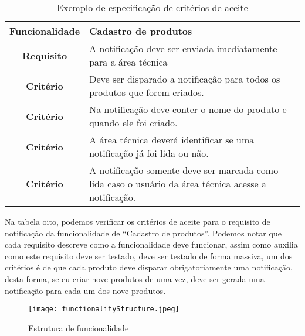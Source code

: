       \begin{table}[h!]
        \centering
        \begin{tabular}{|c|p{10cm}|}
          \hline
          \textbf{Funcionalidade} &
          Cadastro de produtos \\ \hline
          \textbf{Requisito} &
          A notificação deve ser enviada imediatamente para a área técnica \\ \hline
          \textbf{Critério} &
          Deve ser disparado a notificação para todos os produtos que forem criados. \\ \hline
          \textbf{Critério} &
          Na notificação deve conter o nome do produto e quando ele foi criado. \\ \hline
          \textbf{Critério} &
          A área técnica deverá identificar se uma notificação já foi lida ou não. \\ \hline
          \textbf{Critério} &
          A notificação somente deve ser marcada como lida caso o usuário da área
          técnica acesse a notificação. \\ \hline
        \end{tabular}
        \caption{Exemplo de especificação de critérios de aceite}
        \label{Tabela:8}
      \end{table}

      Na tabela oito, podemos verificar os critérios de aceite para o requisito de
      notificação da funcionalidade de “Cadastro de produtos”. Podemos notar que cada
      requisito descreve como a funcionalidade deve funcionar, assim como auxilia
      como este requisito deve ser testado, deve ser testado de forma massiva,
      um dos critérios é de que cada produto deve disparar obrigatoriamente uma
      notificação, desta forma, se eu criar nove produtos de uma vez, deve ser
      gerada uma notificação para cada um dos nove produtos. \newline

      \begin{figure}[!h]
        \centering
        \texttt{[image: functionalityStructure.jpeg]}
        \caption{Estrutura de funcionalidade}
        \label{Imagem:1}
      \end{figure}

